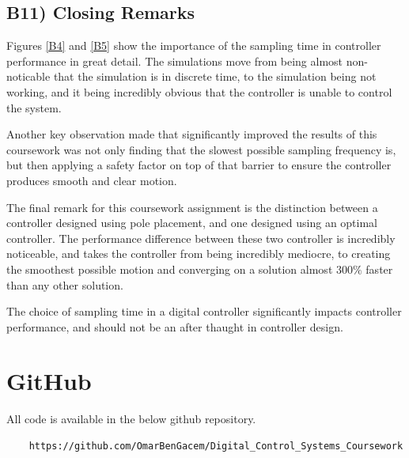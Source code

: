 \documentclass{article}
\begin{document}
\subsection*{B11) Closing Remarks}
Figures \ref{B4} and \ref{B5} show the importance of the sampling time in controller performance in great detail. The simulations move from being almost non-noticable that the simulation is in discrete time, to the simulation being not working, and it being incredibly obvious that the controller is unable to control the system. 
\newline

Another key observation made that significantly improved the results of this coursework was not only finding that the slowest possible sampling frequency is, but then applying a safety factor on top of that barrier to ensure the controller produces smooth and clear motion.
\newline

The final remark for this coursework assignment is the distinction between a controller designed using pole placement, and one designed using an optimal controller. The performance difference between these two controller is incredibly noticeable, and takes the controller from being incredibly mediocre, to creating the smoothest possible motion and converging on a solution almost $300\%$ faster than any other solution.
\newline

The choice of sampling time in a digital controller significantly impacts controller performance, and should not be an after thaught in controller design.



\newpage
\appendix

\section{GitHub}

All code is available in the below github repository.
\begin{verbatim}
    https://github.com/OmarBenGacem/Digital_Control_Systems_Coursework
\end{verbatim}
\end{document}
